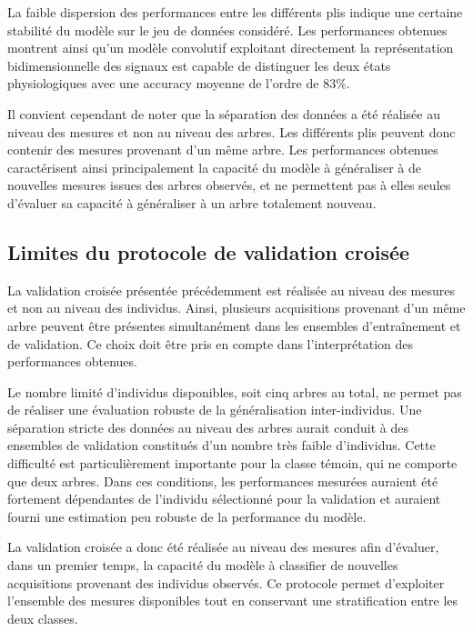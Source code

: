 \documentclass[12pt,a4paper,twoside]{article}
\begin{document}
La faible dispersion des performances entre les différents plis indique une certaine stabilité du modèle sur le jeu de données considéré. Les performances obtenues montrent ainsi qu'un modèle convolutif exploitant directement la représentation bidimensionnelle des signaux est capable de distinguer les deux états physiologiques avec une accuracy moyenne de l'ordre de $83\%$.

Il convient cependant de noter que la séparation des données a été réalisée au niveau des mesures et non au niveau des arbres. Les différents plis peuvent donc contenir des mesures provenant d'un même arbre. Les performances obtenues caractérisent ainsi principalement la capacité du modèle à généraliser à de nouvelles mesures issues des arbres observés, et ne permettent pas à elles seules d'évaluer sa capacité à généraliser à un arbre totalement nouveau.

\subsection{Limites du protocole de validation croisée}
\label{subsec:limites_kfold_2d}

La validation croisée présentée précédemment est réalisée au niveau des mesures et non au niveau des individus. Ainsi, plusieurs acquisitions provenant d'un même arbre peuvent être présentes simultanément dans les ensembles d'entraînement et de validation. Ce choix doit être pris en compte dans l'interprétation des performances obtenues.

Le nombre limité d'individus disponibles, soit cinq arbres au total, ne permet pas de réaliser une évaluation robuste de la généralisation inter-individus. Une séparation stricte des données au niveau des arbres aurait conduit à des ensembles de validation constitués d'un nombre très faible d'individus. Cette difficulté est particulièrement importante pour la classe témoin, qui ne comporte que deux arbres. Dans ces conditions, les performances mesurées auraient été fortement dépendantes de l'individu sélectionné pour la validation et auraient fourni une estimation peu robuste de la performance du modèle.

La validation croisée a donc été réalisée au niveau des mesures afin d'évaluer, dans un premier temps, la capacité du modèle à classifier de nouvelles acquisitions provenant des individus observés. Ce protocole permet d'exploiter l'ensemble des mesures disponibles tout en conservant une stratification entre les deux classes.
\end{document}
